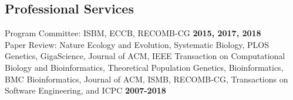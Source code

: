 \documentclass[margin,line,letterpaper]{resume}
\begin{document}
\begin{resume}
    \section{\mysidestyle Professional Services}
    Program Committee: ISBM, ECCB, RECOMB-CG  \hfill \textbf{2015, 2017, 2018}\vspace{1mm}\\
    Paper Review:  Nature Ecology and Evolution, Systematic Biology, PLOS Genetics, GigaScience, Journal of ACM, IEEE Transaction on Computational Biology and Bioinformatics, Theoretical Population Genetics, Bioinformatics, BMC Bioinformatics, Journal of ACM, ISMB, RECOMB-CG, Transactions on Software Engineering, and ICPC    \hfill \textbf{2007-2018}\vspace{1mm}

\end{resume}
\end{document}
